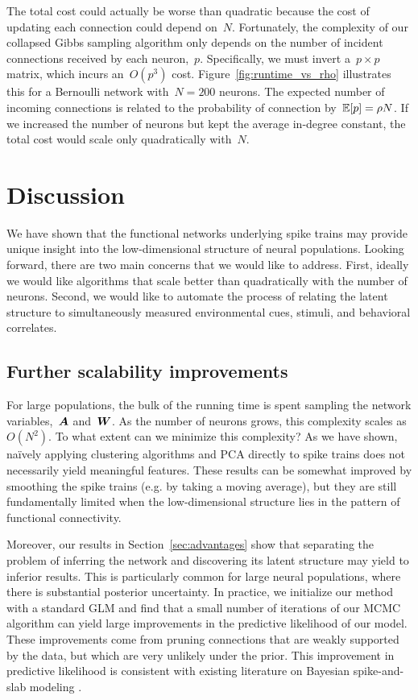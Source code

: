 The total cost could actually be worse than quadratic because the cost
of updating each connection could depend on~$N$. Fortunately, the
complexity of our collapsed Gibbs sampling algorithm only depends on
the number of incident connections received by each neuron,~$p$.
Specifically, we must invert a~$p \times p$ matrix, which incurs
an~$O(p^3)$ cost. Figure~\ref{fig:runtime_vs_rho} illustrates this for
a Bernoulli network with~$N=200$ neurons. The expected number of
incoming connections is related to the probability of connection
by~$\mathbb{E}[p]=\rho N$. If we increased the number of neurons but kept
the average in-degree constant, the total cost would scale only
quadratically with~$N$.



\section{Discussion}
\label{sec:discussion}
We have shown that the functional networks underlying
spike trains may provide unique insight into the low-dimensional
structure of neural populations. Looking forward, there are 
two main concerns that we would like to address.
First, ideally we would like algorithms that scale better 
than quadratically with the number of neurons. Second, we 
would like to automate the process of relating the latent 
structure to simultaneously measured environmental cues, stimuli, 
and behavioral correlates. 

\subsection{Further scalability improvements}
For large populations, the bulk of the running time is spent 
sampling the network variables,~$\boldsymbol{A}$ and~$\boldsymbol{W}$. As the number of
neurons grows, this complexity scales as~$O(N^2)$. To
what extent can we minimize this complexity? As we have shown,
na\"ively applying clustering algorithms and PCA directly
to spike trains does not necessarily yield meaningful features. These
results can be somewhat improved by smoothing the spike
trains (e.g. by taking a moving average), but they are still
fundamentally limited when the low-dimensional structure
lies in the pattern of functional connectivity.

Moreover, our results in Section~\ref{sec:advantages} show that 
separating the problem of inferring the network and discovering 
its latent structure may yield to inferior results. This is 
particularly common for large neural populations, where there is 
substantial posterior uncertainty. 
In practice, we initialize our method with a standard GLM and
find that a small number of iterations of our MCMC algorithm
can yield large improvements in the predictive likelihood of our
model. These improvements come from pruning connections that are
weakly supported by the data, but which are very unlikely under the
prior. This improvement in predictive likelihood is consistent with
existing literature on Bayesian spike-and-slab modeling \cite{Mohamed-2012}.

